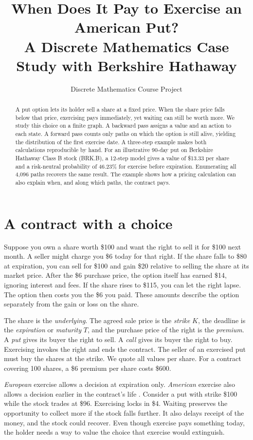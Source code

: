 \documentclass[11pt]{article}
\title{When Does It Pay to Exercise an American Put?\\
A Discrete Mathematics Case Study with Berkshire Hathaway}
\author{Discrete Mathematics Course Project}
\date{}
\begin{document}
\maketitle

\begin{abstract}
A put option lets its holder sell a share at a fixed price. When the share price falls below that price, exercising pays immediately, yet waiting can still be worth more. We study this choice on a finite graph. A backward pass assigns a value and an action to each state. A forward pass counts only paths on which the option is still alive, yielding the distribution of the first exercise date. A three-step example makes both calculations reproducible by hand. For an illustrative 90-day put on Berkshire Hathaway Class B stock (BRK.B), a 12-step model gives a value of \$13.33 per share and a risk-neutral probability of 46.23\% for exercise before expiration. Enumerating all 4,096 paths recovers the same result. The example shows how a pricing calculation can also explain when, and along which paths, the contract pays.
\end{abstract}

\section{A contract with a choice}
Suppose you own a share worth \$100 and want the right to sell it for \$100 next month. A seller might charge you \$6 today for that right. If the share falls to \$80 at expiration, you can sell for \$100 and gain \$20 relative to selling the share at its market price. After the \$6 purchase price, the option itself has earned \$14, ignoring interest and fees. If the share rises to \$115, you can let the right lapse. The option then costs you the \$6 you paid. These amounts describe the option separately from the gain or loss on the share.

The share is the \emph{underlying}. The agreed sale price is the \emph{strike} $K$, the deadline is the \emph{expiration} or \emph{maturity} $T$, and the purchase price of the right is the \emph{premium}. A \emph{put} gives its buyer the right to sell. A \emph{call} gives its buyer the right to buy. Exercising invokes the right and ends the contract. The seller of an exercised put must buy the shares at the strike. We quote all values per share. For a contract covering 100 shares, a \$6 premium per share costs \$600.

\emph{European} exercise allows a decision at expiration only. \emph{American} exercise also allows a decision earlier in the contract's life \citep{oic}. Consider a put with strike \$100 while the stock trades at \$96. Exercising locks in \$4. Waiting preserves the opportunity to collect more if the stock falls further. It also delays receipt of the money, and the stock could recover. Even though exercise pays something today, the holder needs a way to value the choice that exercise would extinguish.
\end{document}
